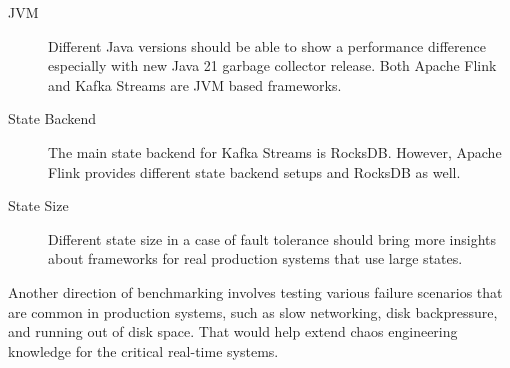 \begin{description}
    \item[JVM] Different Java versions should be able to show a performance difference especially with new Java 21
    garbage collector release.
    Both Apache Flink and Kafka Streams are JVM based frameworks.
    \item[State Backend] The main state backend for Kafka Streams is RocksDB. However, Apache Flink provides
    different state backend setups and RocksDB as well.
    \item[State Size] Different state size in a case of fault tolerance should bring more insights about frameworks
    for real production systems that use large states.
\end{description}

Another direction of benchmarking involves testing various failure scenarios that are common in production systems,
such as slow networking, disk backpressure, and running out of disk space.
That would help extend chaos engineering knowledge for the critical real-time systems.


